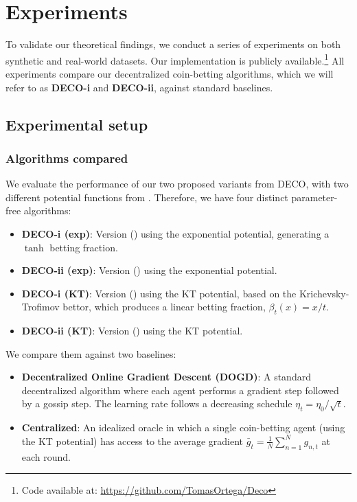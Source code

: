 \documentclass[journal]{IEEEtran} %
\newcommand{\algname}{{DECO}\xspace}
\begin{document}
\section{Experiments}\label{sec:experiments}

To validate our theoretical findings, we conduct a series of experiments on both synthetic and real-world datasets.
Our implementation is publicly available.\footnote{Code available at: \url{https://github.com/TomasOrtega/Deco}}
All experiments compare our decentralized coin-betting algorithms, which we will refer to as \textbf{\algname{}-i} and \textbf{\algname{}-ii}, against standard baselines.

\subsection{Experimental setup}

\subsubsection*{Algorithms compared}
We evaluate the performance of our two proposed variants from \algname{}, with two different potential functions from .
Therefore, we have four distinct parameter-free algorithms:
\begin{itemize}
    \item \textbf{\algname{}-i (exp)}: Version () using the exponential potential, generating a $\tanh$ betting fraction.
    \item \textbf{\algname{}-ii (exp)}: Version () using the exponential potential.
    \item \textbf{\algname{}-i (KT)}: Version () using the KT potential, based on the Krichevsky-Trofimov bettor, which produces a linear betting fraction, $\beta_t(x) = x/t$.
    \item \textbf{\algname{}-ii (KT)}: Version () using the KT potential.
\end{itemize}
We compare them against two baselines:
\begin{itemize}
    \item \textbf{Decentralized Online Gradient Descent (DOGD)}: A standard decentralized algorithm where each agent performs a gradient step followed by a gossip step.
          The learning rate follows a decreasing schedule $\eta_t = \eta_0 / \sqrt{t}$.
    \item \textbf{Centralized}: An idealized oracle in which a single coin-betting agent (using the KT potential) has access to the average gradient $\bar{g}_t = \frac{1}{N}\sum_{n=1}^N g_{n,t}$ at each round.
\end{itemize}
\end{document}
